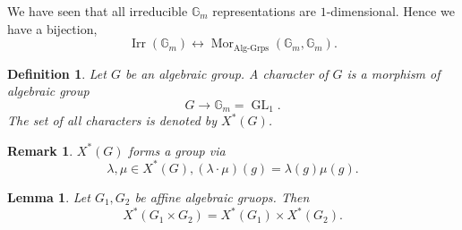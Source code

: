 \documentclass[10pt]{article}
\newtheorem{definition}{Definition}[section]
\newtheorem{lemma}{Lemma}[section]
\newtheorem{remark}{Remark}[section]
\numberwithin{equation}{theorem}
\DeclareMathOperator{\Irr}{Irr}
\DeclareMathOperator{\Mor}{Mor}
\DeclareMathOperator{\GL}{GL}
\newcommand{\G}[0]{\mathbb{G}}
\begin{document}
We have seen that all irreducible $\G_m$ representations are $1$-dimensional. Hence we have a bijection, 
\begin{equation*}
  \Irr(\G_m)\leftrightarrow\Mor_{\text{Alg-Grps}}(\G_m,\G_m).
\end{equation*}
\begin{definition}
  Let $G$ be an algebraic group. A character of $G$ is a morphism of algebraic group 
  \begin{equation*}
    G\to\G_m=\GL_1.
  \end{equation*}
  The set of all characters is denoted by $X^*(G)$. 
\end{definition}
\begin{remark}
  $X^*(G)$ forms a group via 
  \begin{equation*}
    \lambda,\mu\in X^*(G), (\lambda\cdot\mu)(g) = \lambda(g)\mu(g).
  \end{equation*}
\end{remark}
\begin{lemma}
  \label{lemma_1_1_30}
  Let $G_1,G_2$ be affine algebraic gruops. Then 
  \begin{equation*}
    X^*(G_1\times G_2) = X^*(G_1)\times X^*(G_2).
  \end{equation*}
\end{lemma}
\end{document}
